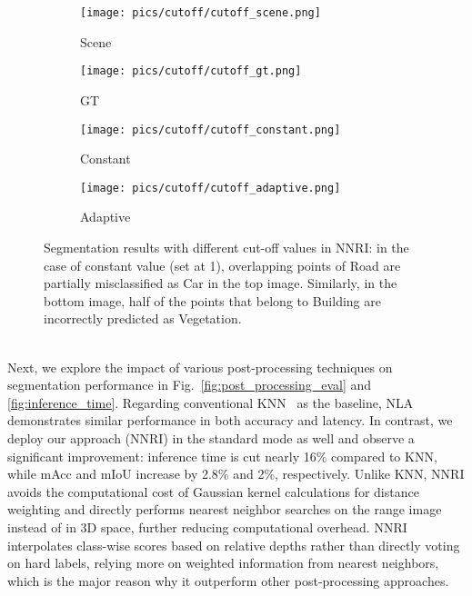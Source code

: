 \begin{figure}[t]
  \centering
  \begin{subfigure}[b]{0.15\textwidth}
  \centering
    \texttt{[image: pics/cutoff/cutoff\_scene.png]}
    \caption{Scene}
  \end{subfigure}
  \begin{subfigure}[b]{0.1\textwidth}
  \centering
    \texttt{[image: pics/cutoff/cutoff\_gt.png]}
    \caption{GT}
  \end{subfigure}
  \begin{subfigure}[b]{0.1\textwidth}
  \centering
    \texttt{[image: pics/cutoff/cutoff\_constant.png]}
    \caption{Constant}
  \end{subfigure}
  \begin{subfigure}[b]{0.1\textwidth}
  \centering
    \texttt{[image: pics/cutoff/cutoff\_adaptive.png]}
    \caption{Adaptive}
  \end{subfigure}
  \caption{Segmentation results with different cut-off values in NNRI: in the case of constant value (set at 1), overlapping points of \textcolor{SemanticKITTI-Road}{Road} are partially misclassified as \textcolor{SemanticKITTI-Car}{Car} in the top image. Similarly, in the bottom image, half of the points that belong to \textcolor{SemanticKITTI-Building}{Building} are incorrectly predicted as \textcolor{SemanticKITTI-Veg}{Vegetation}.}
  \label{fig:cutoff-values}
  \vspace{-7.5mm}
\end{figure}\\
Next, we explore the impact of various post-processing techniques on segmentation performance in Fig.~\ref{fig:post_processing_eval} and \ref{fig:inference_time}. Regarding conventional KNN~\cite{2019rangenet++} as the baseline, NLA~\cite{zhao2021fidnet} demonstrates similar performance in both accuracy and latency. In contrast, we deploy our approach (NNRI) in the standard mode as well and observe a significant improvement: inference time is cut nearly 16\% compared to KNN, while mAcc and mIoU increase by 2.8\% and 2\%, respectively. Unlike KNN, NNRI avoids the computational cost of Gaussian kernel calculations for distance weighting and directly performs nearest neighbor searches on the range image instead of in 3D space, further reducing computational overhead. NNRI interpolates class-wise scores based on relative depths rather than directly voting on hard labels, relying more on weighted information from nearest neighbors, which is the major reason why it outperform other post-processing approaches.\\ %

